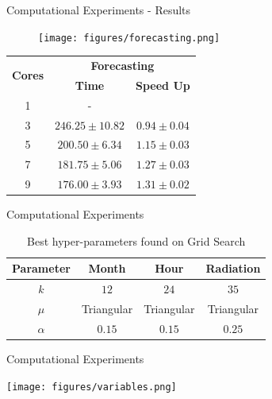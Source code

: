 \documentclass{beamer}
\begin{document}
\begin{frame}{Computational Experiments - Results}
\linespread{1}
\begin{figure}
    \texttt{[image: figures/forecasting.png]}
\end{figure}
\begin{table}[]
    \centering
    \begin{tabular}{|c|c|c|}
\hline
\multirow{2}{*}{\textbf{Cores}} & \multicolumn{2}{c|}{\textbf{Forecasting}} \\ \cline{2-3} 
& \textbf{Time}    & \textbf{Speed Up}    \\ \hline
1 & - \\ \hline
3 & $246.25 \pm 10.82$ & $0.94 \pm 0.04$ \\ \hline
5 & $200.50 \pm 6.34$ & $1.15 \pm 0.03$ \\ \hline
7 & $181.75 \pm 5.06$ & $1.27 \pm 0.03$ \\ \hline
9 & $176.00 \pm 3.93$ & $1.31 \pm 0.02$ \\ \hline
\end{tabular}
\end{table}

\end{frame}

\begin{frame}{Computational Experiments}
    \begin{table}[htb]
    \centering
    \begin{tabular}{|c|c|c|c|} \hline
        \textbf{Parameter} & \textbf{Month} & \textbf{Hour} & \textbf{Radiation} \\ \hline
         $k$ & $12$ & $24$ & $35$ \\ \hline
         $\mu$ & Triangular  & Triangular  & Triangular   \\ \hline
         $\alpha$ & $0.15$ & $0.15$ & $0.25$  \\ \hline
    \end{tabular}
    \caption{Best hyper-parameters found on Grid Search}
    \label{tab:results}
\end{table}
\end{frame}

\begin{frame}{Computational Experiments}

\texttt{[image: figures/variables.png]}

\end{frame}
\end{document}
